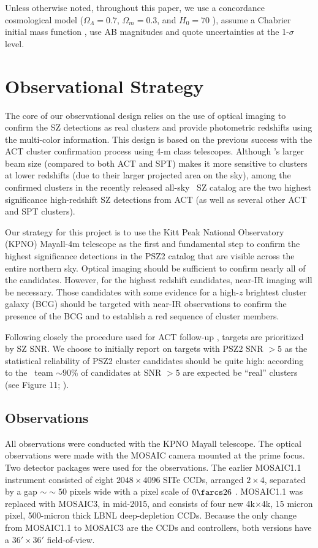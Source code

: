 \documentclass[apj, revtex4-1]{emulateapj}
\begin{document}
Unless otherwise noted, throughout this paper, we use a concordance cosmological model ($\Omega_\Lambda = 0.7$, $\Omega_m = 0.3$, and $H_0= 70$ \kms \permpc), assume a Chabrier initial mass function \citep{Chabrier2003}, use AB magnitudes \citep{Oke1974} and quote uncertainties at the 1-$\sigma$ level.

\section{Observational Strategy}\label{sec:design}

The core of our observational design relies on the use of optical imaging to confirm the SZ detections as real clusters and provide photometric redshifts using the multi-color information. This design is based on the previous success with the ACT cluster confirmation process using 4-m class telescopes. Although \planck's larger beam size (compared to both ACT and SPT) makes it more sensitive to clusters at lower redshifts (due to their larger projected area on the sky), among the confirmed clusters in the recently released all-sky \planck\ SZ catalog are the two highest significance high-redshift SZ detections from ACT (as well as several other ACT and SPT clusters).

Our strategy for this project is to use the Kitt Peak National Observatory (KPNO) Mayall-4m telescope as the first and fundamental step to confirm the highest significance detections in the PSZ2 catalog that are visible across the entire northern sky. Optical imaging should be sufficient to confirm nearly all of the candidates. However, for the highest redshift candidates, near-IR imaging will be necessary. Those candidates with some evidence for a high-$z$ brightest cluster galaxy (BCG) should be targeted with near-IR observations to confirm the presence of the BCG and to establish a red sequence of cluster members.

Following closely the procedure used for ACT follow-up , targets are prioritized by SZ SNR. We choose to initially report on targets with PSZ2 SNR $>5$ as the statistical reliability of PSZ2 cluster candidates should be quite high: according to the \planck\ team $\sim90$\% of candidates at SNR $>5$ are expected be ``real'' clusters (see Figure 11; \citealt{PlanckCollaboration2015a}).

\subsection{Observations}\label{sec: observations}
All observations were conducted with the KPNO Mayall telescope. The optical observations were made with the MOSAIC camera mounted at the prime focus. Two detector packages were used for the observations. The earlier MOSAIC1.1 instrument consisted of eight $2048\times4096$ SITe CCDs, arranged $2\times4$, separated by a gap $∼\sim50$ pixels wide with a pixel scale of $0\farcs26$ \perpixel. MOSAIC1.1 was replaced with MOSAIC3, in mid-2015, and consists of four new 4k$\times$4k, 15 micron pixel, 500-micron thick LBNL deep-depletion CCDs. Because the only change from MOSAIC1.1 to MOSAIC3 are the CCDs and controllers, both versions have a $36' \times 36'$ field-of-view.
\end{document}
